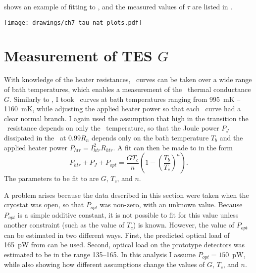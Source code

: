  shows an example of fitting to , and the measured values of $\tau$ are listed in .

\begin{figure*}
  \centering
\texttt{[image: drawings/ch7-tau-nat-plots.pdf]}
\caption{
  Plot showing example of fit to , for .
  The y-intercept at $I_{bias} \delta I = 0$ gives $\tau$, \SI{9.45}{\ms}.
} 
\label{fig:tau-nat-plots}
\end{figure*}

\section{Measurement of \textsc{TES} $G$} \label{sec:g-psat}

With knowledge of the heater resistances, \IV\ curves can be taken over a wide range of bath temperatures, which enables a measurement of the \TES\ thermal conductance $G$.
Similarly to , I took \IV\ curves at bath temperatures ranging from 995~mK -- 1160~mK, while adjusting the applied heater power so that each \IV\ curve had a clear normal branch.
I again used the assumption that high in the transition the \TES\ resistance depends on only the \TES\ temperature, so that the Joule power $P_J$ dissipated in the \TES\ at $0.99R_n$ depends only on the bath temperature $T_b$ and the applied heater power $P_{htr} = I_{htr}^2 R_{htr}$. A fit can then be made to  in the form
\begin{equation}\label{eqn:g-fit}
P_{htr} + P_J + P_{opt}= \frac{G T_c}{n}\left(1 - \left(\frac{T_b}{T_c}\right)^n\right).
\end{equation}
The parameters to be fit to are $G$, $T_c$, and $n$.

A problem arises because the data described in this section were taken when the cryostat was open, so that $P_{opt}$ was non-zero, with an unknown value.
Because $P_{opt}$ is a simple additive constant, it is not possible to fit for this value unless another constraint (such as the value of $T_c$) is known.
However, the value of $P_{opt}$ can be estimated in two different ways. 
First, the predicted optical load of 165~pW from  can be used.
Second, optical load on the prototype detectors was estimated to be in the range \SIrange{135}{165}{\pW}.
In this analysis I assume $P_{opt} = 150$~pW, while also showing how different assumptions change the values of  $G$, $T_c$, and $n$.

